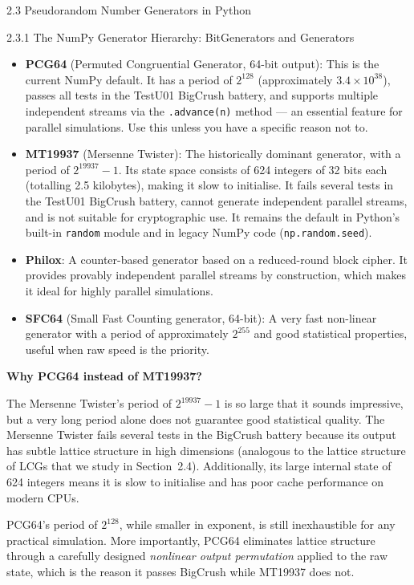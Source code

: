 \documentclass[aspectratio=169,10pt]{beamer}
\begin{document}
\begin{frame}[allowframebreaks]{2.3 Pseudorandom Number Generators in Python}
\begin{block}{2.3.1 The NumPy Generator Hierarchy: BitGenerators and Generators}
\begin{itemize}
  \item \textbf{PCG64} (Permuted Congruential Generator, 64-bit output): This
    is the current NumPy default.  It has a period of $2^{128}$ (approximately
    $3.4 \times 10^{38}$), passes all tests in the TestU01 BigCrush battery,
    and supports multiple independent streams via the \texttt{.advance(n)}
    method --- an essential feature for parallel simulations.  Use this unless
    you have a specific reason not to.
  \item \textbf{MT19937} (Mersenne Twister): The historically dominant
    generator, with a period of $2^{19937}-1$.  Its state space consists of
    624 integers of 32 bits each (totalling 2.5 kilobytes), making it slow to
    initialise.  It fails several tests in the TestU01 BigCrush battery,
    cannot generate independent parallel streams, and is not suitable for
    cryptographic use.  It remains the default in Python's built-in
    \texttt{random} module and in legacy NumPy code (\texttt{np.random.seed}).
  \item \textbf{Philox}: A counter-based generator based on a reduced-round
    block cipher.  It provides provably independent parallel streams by
    construction, which makes it ideal for highly parallel simulations.
  \item \textbf{SFC64} (Small Fast Counting generator, 64-bit): A very fast
    non-linear generator with a period of approximately $2^{255}$ and good
    statistical properties, useful when raw speed is the priority.
\end{itemize}
\end{block}

\textbf{Why PCG64 instead of MT19937?}

The Mersenne Twister's period of $2^{19937}-1$ is so large that it sounds
impressive, but a very long period alone does not guarantee good statistical
quality.  The Mersenne Twister fails several tests in the BigCrush battery
because its output has subtle lattice structure in high dimensions (analogous
to the lattice structure of LCGs that we study in Section~2.4).  Additionally,
its large internal state of 624 integers means it is slow to initialise and
has poor cache performance on modern CPUs.

PCG64's period of $2^{128}$, while smaller in exponent, is still
inexhaustible for any practical simulation.  More importantly, PCG64
eliminates lattice structure through a carefully designed \emph{nonlinear
output permutation} applied to the raw state, which is the reason it passes
BigCrush while MT19937 does not.


\end{frame}
\end{document}
